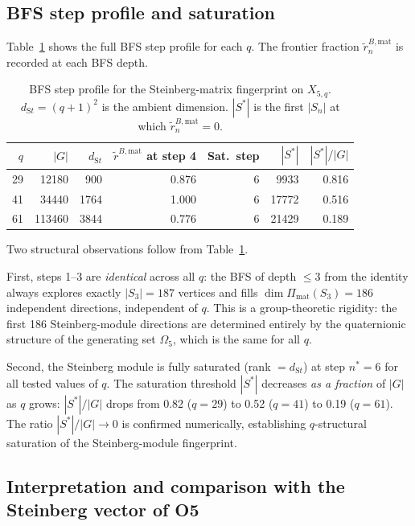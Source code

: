 \documentclass[11pt]{article}
\theoremstyle{definition}
\theoremstyle{remark}
\newcommand{\rbmat}{\tilde{r}^{B,\mathrm{mat}}}
\begin{document}
  \subsection{BFS step profile and saturation}
    \label{ssec:saturation}

    Table~\ref{tab:saturation} shows the full BFS step profile for each $q$.
    The frontier fraction $\rbmat_n$ is recorded at each BFS depth.

    \begin{table}[ht]
      \centering
      \caption{BFS step profile for the Steinberg-matrix fingerprint on $X_{5,q}$.
        $d_{\mathrm St} = (q+1)^2$ is the ambient dimension.
        $|S^*|$ is the first $|S_n|$ at which $\rbmat_n = 0$.}
      \label{tab:saturation}
      \begin{tabular}{@{}rrrrrrr@{}}
        \toprule
        $q$ & $|G|$ & $d_{\mathrm St}$ & $\rbmat$ at step 4 & Sat.\ step & $|S^*|$ &
        $|S^*|/|G|$ \\
        \midrule
        29 & 12180  & 900  & 0.876 & 6 & 9933  & 0.816 \\
        41 & 34440  & 1764 & 1.000 & 6 & 17772 & 0.516 \\
        61 & 113460 & 3844 & 0.776 & 6 & 21429 & 0.189 \\
        \bottomrule
      \end{tabular}
    \end{table}

    Two structural observations follow from Table~\ref{tab:saturation}.

    First, steps 1--3 are \emph{identical} across all $q$: the BFS of depth $\leq 3$
    from the identity always explores exactly $|S_3| = 187$ vertices and fills
    $\dim \Pi_{\mathrm{mat}}(S_3) = 186$ independent directions, independent of $q$.
    This is a group-theoretic rigidity: the first 186 Steinberg-module directions
    are determined entirely by the quaternionic structure of the generating set
    $\Omega_5$, which is the same for all $q$.

    Second, the Steinberg module is fully saturated (rank $= d_{\mathrm St}$) at step
    $n^* = 6$ for all tested values of $q$.
    The saturation threshold $|S^*|$ decreases \emph{as a fraction} of $|G|$ as
    $q$ grows: $|S^*|/|G|$ drops from 0.82 ($q=29$) to 0.52 ($q=41$) to 0.19
    ($q=61$).
    The ratio $|S^*|/|G| \to 0$ is confirmed numerically, establishing
    $q$-structural saturation of the Steinberg-module fingerprint.

  \subsection{Interpretation and comparison with the Steinberg vector of O5}
    \label{ssec:exponent}
\end{document}
